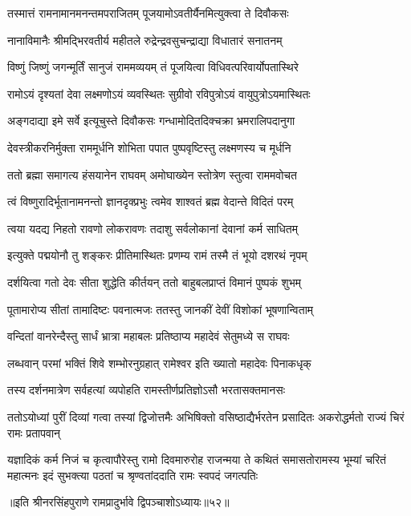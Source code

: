 \twolineshloka
{तस्मात्तं रामनामानमनन्तमपराजितम्}
{पूजयामोऽवतीर्यैनमित्युक्त्वा ते दिवौकसः} %

\twolineshloka
{नानाविमानैः श्रीमद्भिरवतीर्य महीतले}
{रुद्रेन्द्रवसुचन्द्राद्या विधातारं सनातनम्} %

\twolineshloka
{विष्णुं जिष्णुं जगन्मूर्तिं सानुजं राममव्ययम्}
{तं पूजयित्वा विधिवत्परिवार्योपतास्थिरे} %

\twolineshloka
{रामोऽयं दृश्यतां देवा लक्ष्मणोऽयं व्यवस्थितः}
{सुग्रीवो रविपुत्रोऽयं वायुपुत्रोऽयमास्थितः} %

\twolineshloka
{अङ्गदाद्या इमे सर्वे इत्यूचुस्ते दिवौकसः}
{गन्धामोदितदिक्चक्रा भ्रमरालिपदानुगा} %

\twolineshloka
{देवस्त्रीकरनिर्मुक्ता राममूर्धनि शोभिता}
{पपात पुष्पवृष्टिस्तु लक्ष्मणस्य च मूर्धनि} %

\twolineshloka
{ततो ब्रह्मा समागत्य हंसयानेन राघवम्}
{अमोघाख्येन स्तोत्रेण स्तुत्वा राममवोचत} %


\twolineshloka
{त्वं विष्णुरादिर्भूतानामनन्तो ज्ञानदृक्प्रभुः}
{त्वमेव शाश्वतं ब्रह्म वेदान्ते विदितं परम्} %

\twolineshloka
{त्वया यदद्य निहतो रावणो लोकरावणः}
{तदाशु सर्वलोकानां देवानां कर्म साधितम्} %

\twolineshloka
{इत्युक्ते पद्मयोनौ तु शङ्करः प्रीतिमास्थितः}
{प्रणम्य रामं तस्मै तं भूयो दशरथं नृपम्} %

\twolineshloka
{दर्शयित्वा गतो देवः सीता शुद्धेति कीर्तयन्}
{ततो बाहुबलप्राप्तं विमानं पुष्पकं शुभम्} %

\twolineshloka
{पूतामारोप्य सीतां तामादिष्टः पवनात्मजः}
{ततस्तु जानकीं देवीं विशोकां भूषणान्विताम्} %

\twolineshloka
{वन्दितां वानरेन्दैस्तु सार्धं भ्रात्रा महाबलः}
{प्रतिष्ठाप्य महादेवं सेतुमध्ये स राघवः} %

\twolineshloka
{लब्धवान् परमां भक्तिं शिवे शम्भोरनुग्रहात्}
{रामेश्वर इति ख्यातो महादेवः पिनाकधृक्} %

\twolineshloka
{तस्य दर्शनमात्रेण सर्वहत्यां व्यपोहति}
{रामस्तीर्णप्रतिज्ञोऽसौ भरतासक्तमानसः} %

\threelineshloka
{ततोऽयोध्यां पुरीं दिव्यां गत्वा तस्यां द्विजोत्तमैः}
{अभिषिक्तो वसिष्ठाद्यैर्भरतेन प्रसादितः}
{अकरोद्धर्मतो राज्यं चिरं रामः प्रतापवान्} %

\sixlineindentedshloka
{यज्ञादिकं कर्म निजं च कृत्वा}{पौरेस्तु रामो दिवमारुरोह}
{राजन्मया ते कथितं समासतो}{रामस्य भूम्यां चरितं महात्मनः}
{इदं सुभक्त्या पठतां च श्रृण्वतां}{ददाति रामः स्वपदं जगत्पतिः} %

॥इति श्रीनरसिंहपुराणे रामप्रादुर्भावे द्विपञ्चाशोऽध्यायः॥५२॥

\closesection